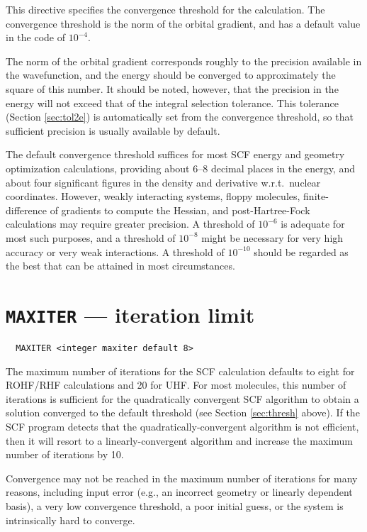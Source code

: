 This directive specifies the convergence threshold for the
calculation.  The convergence threshold is the norm of the orbital
gradient, and has a default value in the code of $10^{-4}$.

The norm of the orbital gradient corresponds roughly to the precision
available in the wavefunction, and the energy should be converged to
approximately the square of this number.  It should be noted, however,
that the precision in the energy will not exceed that of the integral
selection tolerance.  This tolerance (Section \ref{sec:tol2e}) is
automatically set from the convergence threshold, so that sufficient
precision is usually available by default.

The default convergence threshold suffices for most SCF energy and
geometry optimization calculations, providing about 6--8 decimal
places in the energy, and about four significant figures in the
density and derivative w.r.t.\ nuclear coordinates.  However, weakly
interacting systems, floppy molecules, finite-difference of gradients
to compute the Hessian, and post-Hartree-Fock calculations may require
greater precision.  A threshold of $10^{-6}$ is adequate for most such
purposes, and a threshold of $10^{-8}$ might be necessary for very
high accuracy or very weak interactions.  A threshold of $10^{-10}$
should be regarded as the best that can be attained in most
circumstances.

\section{{\tt MAXITER} --- iteration limit}
\label{sec:max}

\begin{verbatim}
  MAXITER <integer maxiter default 8>
\end{verbatim}

\sloppy

The maximum number of iterations for the SCF calculation defaults to
eight for ROHF/RHF calculations and 20 for UHF.  For most molecules,
this number of iterations is sufficient for the quadratically
convergent SCF algorithm to obtain a solution converged to the
default threshold (see Section \ref{sec:thresh} above).  If the SCF
program detects that the quad\-ratically-con\-ver\-gent algorithm is not
efficient, then it will resort to a lin\-early-con\-ver\-gent algorithm and
increase the maximum number of iterations by 10.

\fussy

Convergence may not be reached in the maximum number of iterations for
many reasons, including input error (e.g., an incorrect geometry or
linearly dependent basis), a very low convergence threshold, a poor
initial guess, or the system is intrinsically hard to converge. 

